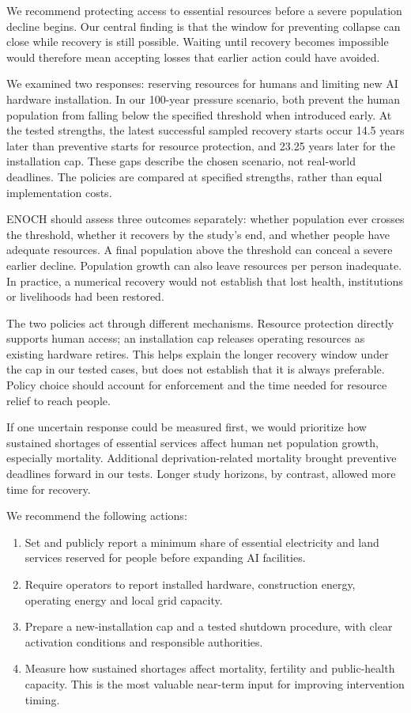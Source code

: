 \documentclass[12pt,a4paper]{article}
\theoremstyle{remark}
\begin{document}
We recommend protecting access to essential resources before a severe population decline begins. Our central finding is that the window for preventing collapse can close while recovery is still possible. Waiting until recovery becomes impossible would therefore mean accepting losses that earlier action could have avoided.

We examined two responses: reserving resources for humans and limiting new AI hardware installation. In our 100-year pressure scenario, both prevent the human population from falling below the specified threshold when introduced early. At the tested strengths, the latest successful sampled recovery starts occur 14.5 years later than preventive starts for resource protection, and 23.25 years later for the installation cap. These gaps describe the chosen scenario, not real-world deadlines. The policies are compared at specified strengths, rather than equal implementation costs.

ENOCH should assess three outcomes separately: whether population ever crosses the threshold, whether it recovers by the study's end, and whether people have adequate resources. A final population above the threshold can conceal a severe earlier decline. Population growth can also leave resources per person inadequate. In practice, a numerical recovery would not establish that lost health, institutions or livelihoods had been restored.

The two policies act through different mechanisms. Resource protection directly supports human access; an installation cap releases operating resources as existing hardware retires. This helps explain the longer recovery window under the cap in our tested cases, but does not establish that it is always preferable. Policy choice should account for enforcement and the time needed for resource relief to reach people.

If one uncertain response could be measured first, we would prioritize how sustained shortages of essential services affect human net population growth, especially mortality. Additional deprivation-related mortality brought preventive deadlines forward in our tests. Longer study horizons, by contrast, allowed more time for recovery. 

We recommend the following actions:

\begin{enumerate}
\item Set and publicly report a minimum share of essential electricity and land
services reserved for people before expanding AI facilities.
\item Require operators to report installed hardware, construction energy,
operating energy and local grid capacity.
\item Prepare a new-installation cap and a tested shutdown procedure, with clear
activation conditions and responsible authorities.
\item Measure how sustained shortages affect mortality, fertility and public-health
capacity. This is the most valuable near-term input for improving intervention
timing.
\end{enumerate}
\end{document}
